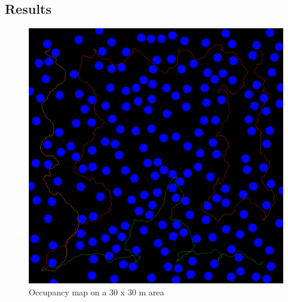 \subsection{Results}
\begin{figure}[h]
\centering
\includegraphics[scale=0.07]{images/preview_map_frame_11193.png}
\caption{Occupancy map on a 30 x 30 m area}
\end{figure}

